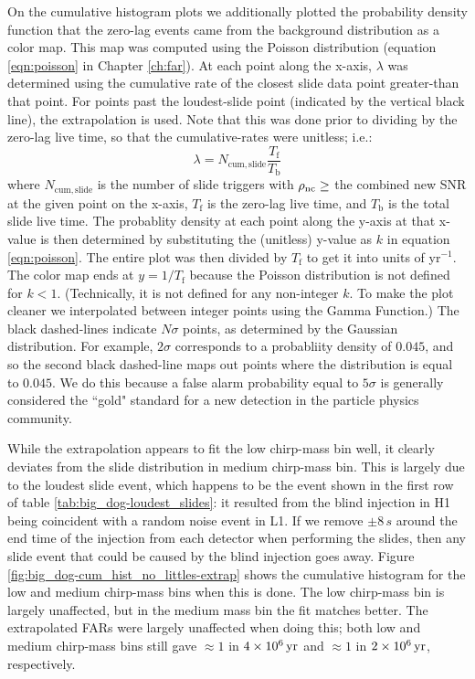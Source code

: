 On the cumulative histogram plots we additionally plotted the probability
density function that the zero-lag events came from the background distribution
as a color map. This map was computed using the Poisson distribution (equation
\ref{eqn:poisson} in Chapter \ref{ch:far}). At each point along the x-axis,
$\lambda$ was determined using the cumulative rate of the closest slide data
point greater-than that point. For points past the loudest-slide point
(indicated by the vertical black line), the extrapolation is used. Note that
this was done prior to dividing by the zero-lag live time, so that the
cumulative-rates were unitless; i.e.:
\begin{equation*}
\lambda = N_{\mathrm{cum,slide}} \frac{T_{\mathrm{f}}}{T_{\mathrm{b}}}
\end{equation*}
where $N_{\mathrm{cum,slide}}$ is the number of slide triggers with $\rho_{\mathrm{nc}}
\geq$ the combined new \ac{SNR} at the given point on the x-axis,
$T_{\mathrm{f}}$ is the zero-lag live time, and $T_{\mathrm{b}}$ is the total
slide live time. The probablity density at each point along the y-axis at that
x-value is then determined by substituting the (unitless) y-value as $k$ in
equation \ref{eqn:poisson}. The entire plot was then divided by $T_{\mathrm{f}}$ to
get it into units of yr$^{-1}$. The color map ends at $y = 1 / T_{\mathrm{f}}$
because the Poisson distribution is not defined for $k < 1$. (Technically, it
is not defined for any non-integer $k$. To make the plot cleaner we
interpolated between integer points using the Gamma Function.) The black
dashed-lines indicate $N\sigma$ points, as determined by the Gaussian
distribution. For example, $2\sigma$ corresponds to a probabliity density of
$0.045$, and so the second black dashed-line maps out points where the
distribution is equal to $0.045$. We do this because a false alarm probability
equal to $5\sigma$ is generally considered the ``gold" standard for a new
detection in the particle physics community.

While the extrapolation appears to fit the low chirp-mass bin well, it clearly
deviates from the slide distribution in medium chirp-mass bin. This is largely
due to the loudest slide event, which happens to be the event shown in the
first row of table \ref{tab:big_dog-loudest_slides}: it resulted from the blind
injection in H1 being coincident with a random noise event in L1. If we remove
$\pm8\,s$ around the end time of the injection from each detector when
performing the slides, then any slide event that could be caused by the blind
injection goes away. Figure \ref{fig:big_dog-cum_hist_no_littles-extrap} shows
the cumulative histogram for the low and medium chirp-mass bins when this is
done. The low chirp-mass bin is largely unaffected, but in the medium mass bin
the fit matches better. The extrapolated \acp{FAR} were largely unaffected when
doing this; both low and medium chirp-mass bins still gave $\approx 1$ in
$4\times 10^{6}\,\mathrm{yr}$ and $\approx 1$ in $2\times 10^{6}\,\mathrm{yr}$, respectively.

